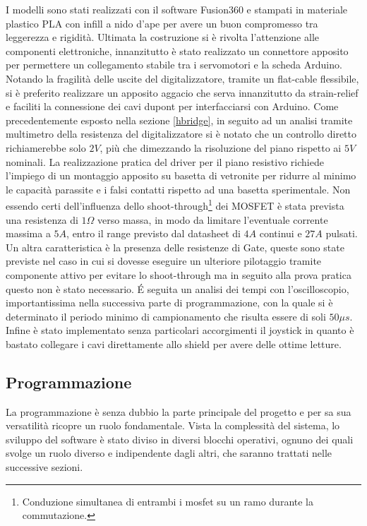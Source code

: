 \documentclass[11pt]{article}
\begin{document}
I modelli sono stati realizzati con il software Fusion360 e stampati in materiale plastico PLA con infill a nido d'ape per avere un buon compromesso tra leggerezza e rigidità. Ultimata la costruzione si è rivolta l'attenzione alle componenti elettroniche, innanzitutto è stato realizzato un connettore apposito per permettere un collegamento stabile tra i servomotori e la scheda Arduino. Notando la fragilità delle uscite del digitalizzatore, tramite un flat-cable flessibile, si è preferito realizzare un apposito aggacio che serva innanzitutto da strain-relief e faciliti la connessione dei cavi dupont per interfacciarsi con Arduino. Come precedentemente esposto nella sezione \ref{hbridge}, in seguito ad un analisi tramite multimetro della resistenza del digitalizzatore si è notato che un controllo diretto richiamerebbe solo $2V$, più che dimezzando la risoluzione del piano rispetto ai $5V$ nominali. La realizzazione pratica del driver per il piano resistivo richiede l'impiego di un montaggio apposito su basetta di vetronite per ridurre al minimo le capacità parassite e i falsi contatti rispetto ad una basetta sperimentale. Non essendo certi dell'influenza dello shoot-through\footnote{Conduzione simultanea di entrambi i mosfet su un ramo durante la commutazione.} dei MOSFET è stata prevista una resistenza di $1\Omega$ verso massa, in modo da limitare l'eventuale corrente massima a $5A$, entro il range previsto dal datasheet di $4A$ continui e $27A$ pulsati. Un altra caratteristica è la presenza delle resistenze di Gate, queste sono state previste nel caso in cui si dovesse eseguire un ulteriore pilotaggio tramite componente attivo per evitare lo shoot-through ma in seguito alla prova pratica questo non è stato necessario. É seguita un analisi dei tempi con l'oscilloscopio, importantissima nella successiva parte di programmazione, con la quale si è determinato il periodo minimo di campionamento che risulta essere di soli $50\mu s$. Infine è stato implementato senza particolari accorgimenti il joystick in quanto è bastato collegare i cavi direttamente allo shield per avere delle ottime letture.

\subsection{Programmazione}\label{programmazione}
La programmazione è senza dubbio la parte principale del progetto e per sa sua versatilità ricopre un ruolo fondamentale. Vista la complessità del sistema, lo sviluppo del software è stato diviso in diversi blocchi operativi, ognuno dei quali svolge un ruolo diverso e indipendente dagli altri, che saranno trattati nelle successive sezioni.
\end{document}
